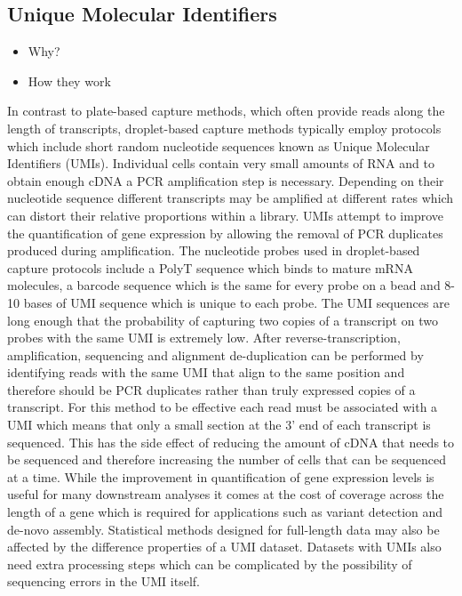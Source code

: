 \documentclass[11pt,a4paper,titlepage,twoside,openright]{style/unimelbthesis}
\theoremstyle{definition}
\theoremstyle{definition}
\theoremstyle{definition}
\theoremstyle{remark}
\begin{document}
\begin{mainmatter}
\hypertarget{unique-molecular-identifiers}{%
\subsection{Unique Molecular Identifiers}\label{unique-molecular-identifiers}}

\begin{itemize}
\tightlist
\item
  Why?
\item
  How they work
\end{itemize}

In contrast to plate-based capture methods, which often provide reads along the length of transcripts, droplet-based capture methods typically employ protocols which include short random nucleotide sequences known as Unique Molecular Identifiers (UMIs). Individual cells contain very small amounts of RNA and to obtain enough cDNA a PCR amplification step is necessary. Depending on their nucleotide sequence different transcripts may be amplified at different rates which can distort their relative proportions within a library. UMIs attempt to improve the quantification of gene expression by allowing the removal of PCR duplicates produced during amplification. The nucleotide probes used in droplet-based capture protocols include a PolyT sequence which binds to mature mRNA molecules, a barcode sequence which is the same for every probe on a bead and 8-10 bases of UMI sequence which is unique to each probe. The UMI sequences are long enough that the probability of capturing two copies of a transcript on two probes with the same UMI is extremely low. After reverse-transcription, amplification, sequencing and alignment de-duplication can be performed by identifying reads with the same UMI that align to the same position and therefore should be PCR duplicates rather than truly expressed copies of a transcript. For this method to be effective each read must be associated with a UMI which means that only a small section at the 3' end of each transcript is sequenced. This has the side effect of reducing the amount of cDNA that needs to be sequenced and therefore increasing the number of cells that can be sequenced at a time. While the improvement in quantification of gene expression levels is useful for many downstream analyses it comes at the cost of coverage across the length of a gene which is required for applications such as variant detection and de-novo assembly. Statistical methods designed for full-length data may also be affected by the difference properties of a UMI dataset. Datasets with UMIs also need extra processing steps which can be complicated by the possibility of sequencing errors in the UMI itself.


\end{mainmatter}
\end{document}

